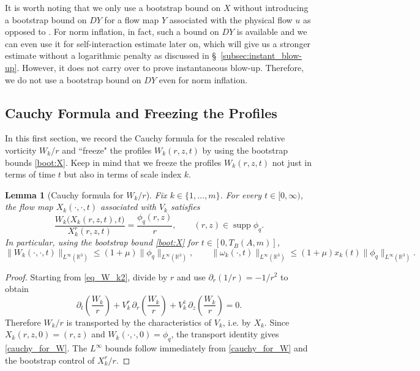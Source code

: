 \documentclass[reqno,11pt]{amsart}
\newtheorem{lemma}[theorem]{Lemma}
\newcommand{\supp}{\operatorname{supp}}
\newcommand{\R}{\mathbb{R}}
\begin{document}
It is worth noting that we only use a bootstrap bound on $X$ without introducing a bootstrap bound on $DY$ for a flow map $Y$ associated with the physical flow $u$ as opposed to \cite{CordobaMartinezZheng25}. For norm inflation, in fact, such a bound on $DY$ is available and we can even use it for self-interaction estimate later on, which will give us a stronger estimate without a logarithmic penalty as discussed in \S~\ref{subsec:instant_blow-up}. However, it does not carry over to prove instantaneous blow-up. Therefore, we do not use a bootstrap bound on $DY$ even for norm inflation.


\subsection{Cauchy Formula and Freezing the Profiles}
\label{sec:est_pro}
In this first section, we record the Cauchy formula for the rescaled relative vorticity $W_k/r$ and ``freeze" the profiles $W_k(r,z,t)$ by using the bootstrap bounds \eqref{boot:X}. Keep in mind that we freeze the profiles $W_k(r,z,t)$ not just in terms of time $t$ but also in terms of scale index $k$.

\begin{lemma}[Cauchy formula for $W_k/r$]\label{lem:Euler_cauchy_geometry1}
Fix $k\in\{1,\dots,m\}$. For every $t\in[0,\infty)$, the flow map $X_k(\cdot,\cdot,t)$ associated with $V_k$ satisfies
\begin{equation}\label{cauchy_for_W}
\frac{W_k\bigl(X_k(r,z,t),t\bigr)}{X_k^r(r,z,t)}=\frac{\phi_q(r,z)}{r},\qquad (r,z)\in\supp\phi_q.
\end{equation}
In particular, using the bootstrap bound \eqref{boot:X} for $t\in [0,T_B(A,m)]$,
\[
\|W_k(\cdot,\cdot,t)\|_{L^\infty(\R^3)}\le (1+\mu)\|\phi_q\|_{L^\infty(\R^3)},
\qquad
\|\omega_k(\cdot,t)\|_{L^\infty(\R^3)}\le (1+\mu)x_k(t)\|\phi_q\|_{L^\infty(\R^3)}.
\]
\end{lemma}

\begin{proof}
Starting from \eqref{eq_W_k2}, divide by $r$ and use $\partial_r(1/r)=-1/r^2$ to obtain
\[
\partial_t\left(\frac{W_k}{r}\right)+V_{k}^r\,\partial_r\left(\frac{W_k}{r}\right)+V_{k}^z\,\partial_z\left(\frac{W_k}{r}\right)=0.
\]
Therefore $W_k/r$ is transported by the characteristics of $V_k$, i.e. by $X_k$. Since $X_k(r,z,0)=(r,z)$ and $W_k(\cdot,\cdot,0)=\phi_q$, the transport identity gives \eqref{cauchy_for_W}. The $L^\infty$ bounds follow immediately from \eqref{cauchy_for_W} and the bootstrap control of $X_k^r/r$.
\end{proof}
\end{document}
